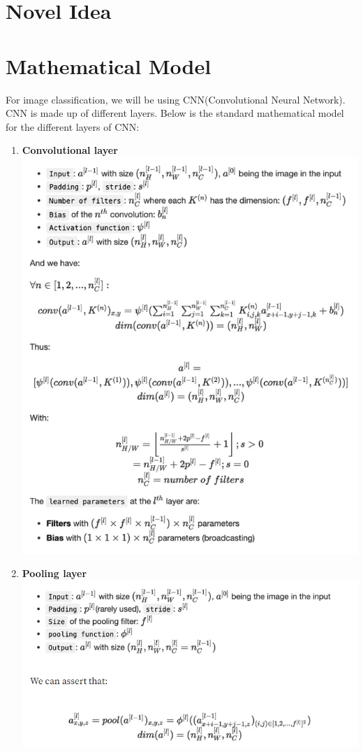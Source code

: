 \documentclass{article}
\begin{document}
\section{Novel Idea}

\section{Mathematical Model}
For image classification, we will be using CNN(Convolutional Neural Network). CNN is made up of different layers. Below is the standard mathematical model for the different layers of CNN:
\begin{enumerate}
    \item \textbf{Convolutional layer}
    \\ \includegraphics[scale = 0.6]{1st.png}
    \item \textbf{Pooling layer}
    \\ \includegraphics[scale = 0.69]{2nd.png}

\end{enumerate}
\end{document}
